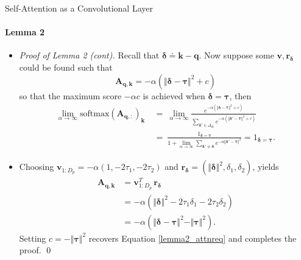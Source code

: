 \documentclass[9pt]{beamer}
\newcommand{\eq}{\ =\ }
\newcommand{\mb}{\bm}
\begin{document}
\newcommand{\sqnorm}[1]{\Vert#1\Vert^2}
\newcommand{\expalpha}[1]{e^{-\alpha#1}}
\newcommand{\limalpha}{\lim_{\alpha\rightarrow\infty}}
\newcommand{\vDelta}{\tau}
\begin{frame}{Self-Attention as a Convolutional Layer}
\framesubtitle{Lemma 2}
\begin{itemize}
\item \textit{Proof of Lemma 2 (cont).} Recall that $\bm \delta \doteq \bm k - \bm q$. Now suppose some $\bm v, \bm r_{\bm \delta}$ could be found such that
\begin{equation}
    \mb A_{\mb q, \mb k} = -\alpha(\sqnorm{\bm{\delta - \tau}} + c) 
    \label{lemma2_attnreq}
\end{equation}
so that the maximum score $-\alpha c$ is achieved when $\bm\delta = \bm\tau$, then
\begin{align*}
    \limalpha \text{softmax}(\mb A_{\mb q, :})_{\mb k} &\eq 
        \limalpha\frac{\expalpha{(\sqnorm{\bm{\delta-\tau}}+c)}}{
            \sum_{\bm\delta'\in\Delta_K}
            \expalpha{(\sqnorm{\bm{\delta'-\tau}}+c)}
        } \\ &\eq \frac{1_{\bm\delta=\bm\tau}}{
            1 + \limalpha\sum_{\bm\delta'\neq \bm\delta}
            \expalpha{\sqnorm{\bm{\delta'-\tau}}}
        } = 1_{\bm\delta=\bm\tau}.
\end{align*}

\item Choosing $\bm v_{1:D_p} = -\alpha(1, -2\tau_1, -2\tau_2)$ and $\bm r_{\bm \delta} = (\Vert\bm \delta\Vert^2, \delta_1, \delta_2)$, yields
\begin{align*}
    \mb A_{\mb q, \bm k} &= 
        \mb v_{1:D_p}^T\, \mb r_{\bm \delta}
        \\ &= -\alpha(\sqnorm{\bm\delta} -2\vDelta_1\delta_1-2\vDelta_2\delta_2) 
        \\ &= -\alpha(\sqnorm{\bm\delta-\bm\vDelta} - \sqnorm{\bm\vDelta}).
\end{align*}
Setting $c=-\sqnorm{\bm\tau}$ recovers Equation \eqref{lemma2_attnreq} and completes the proof. \qed
\end{itemize}
\end{frame}
\end{document}

